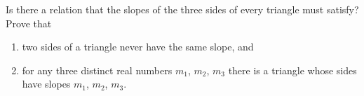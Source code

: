 Is there a relation that the slopes of the three sides of every triangle must satisfy? Prove that
\begin{enumerate}
\item[(a)] two sides of a triangle never have the same slope, and
\item[(b)] for any three distinct real numbers $m_1$, $m_2$, $m_3$ there is a triangle whose sides have slopes $m_1$, $m_2$, $m_3$.
\end{enumerate}
